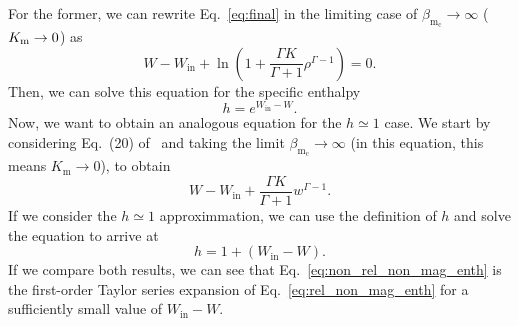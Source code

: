 \documentclass[twocolumn,aps,showpacs,showkeys,prd,superscriptaddress,byrevtex, amsmath]{revtex4-1}
\begin{document}
For the former, we can rewrite Eq.~\eqref{eq:final} in the limiting case of $\beta_{\mathrm{m_c}} \rightarrow \infty$ ($K_{\rm m} \rightarrow 0$) as
\begin{equation}
W - W_{\mathrm{in}} + \ln \left(1 + \frac{\Gamma K}{\Gamma +1}\rho^{\Gamma -1}\right) = 0.
\end{equation}
Then, we can solve this equation for the specific enthalpy
\begin{equation}\label{eq:rel_non_mag_enth}
h = e^{W_{\mathrm{in}} - W}.
\end{equation}
Now, we want to obtain an analogous equation for the $h \simeq 1$ case. We start by considering Eq.~(20) of~\cite{Gimeno-Soler:2017} and taking the limit $\beta_{\mathrm{m_c}} \rightarrow \infty$ (in this equation, this means $K_{\mathrm{m}} \rightarrow 0$), to obtain
\begin{equation}
W - W_{\mathrm{in}} + \frac{\Gamma K}{\Gamma +1}w^{\Gamma -1}.
\end{equation}
If we consider the $h \simeq 1$ approximmation, we can use the definition of $h$ and solve the equation to arrive at
\begin{equation}\label{eq:non_rel_non_mag_enth}
h = 1 + (W_{\mathrm{in}} - W).
\end{equation}
If we compare both results, we can see that Eq.~\eqref{eq:non_rel_non_mag_enth} is the first-order Taylor series expansion of Eq.~\eqref{eq:rel_non_mag_enth} for a sufficiently small value of $W_{\mathrm{in}} - W$.
\end{document}
